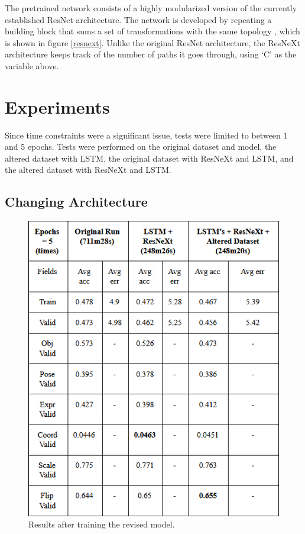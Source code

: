 \documentclass[10pt,twocolumn,letterpaper]{article}
\begin{document}
The pretrained network consists of a highly modularized version of the currently established ResNet architecture. The network is developed by repeating a building block that sums a set of transformations with the same topology \cite{12}, which is shown in figure \ref{resnext}. Unlike the original ResNet architecture, the ResNeXt architecture keeps track of the number of paths it goes through, using ‘C’ as the variable above.


\section{Experiments}

Since time constraints were a significant issue, tests were limited to between 1 and 5 epochs. Tests were performed on the original dataset and model, the altered dataset with LSTM, the original dataset with ResNeXt and LSTM,  and the altered dataset with ResNeXt and LSTM.

\subsection{Changing Architecture}
\begin{figure}[t]
\begin{center}
   \includegraphics[width=0.8\linewidth]{archplot.png}
\end{center}
   \caption{Results after training the revised model.}
\label{archplot}
\end{figure}
\end{document}
